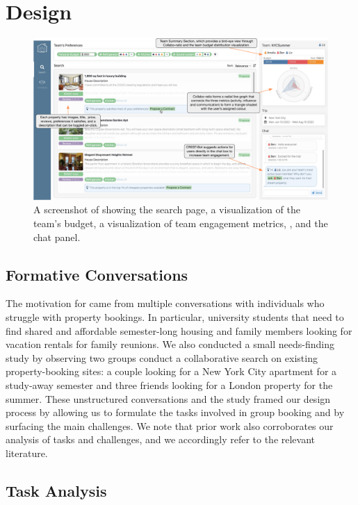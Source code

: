 
\section{Design}
\label{section:design}
\begin{figure}
    \centering
    \includegraphics[width=\textwidth]{images/ui-search.pdf}
    \caption{A screenshot of \tool showing the search page, a visualization of the team's budget, a visualization of team engagement metrics, \collaboRatio, and the chat panel.}
    \label{fig:ui_search}
\end{figure}

\subsection{Formative Conversations} 
\label{ssection:formative-conversations}
The motivation for \tool came from multiple conversations with individuals who struggle with property bookings. In particular, university students that need to find shared and affordable semester-long housing and family members looking for vacation rentals for family reunions. We also conducted a small needs-finding study by observing two groups conduct a collaborative search on existing property-booking sites: a couple looking for a New York City apartment for a study-away semester and three friends looking for a London property for the summer. These unstructured conversations and the study framed our design process by allowing us to formulate the tasks involved in group booking and by surfacing the main challenges. We note that prior work also corroborates our analysis of tasks and challenges, and we accordingly refer to the relevant literature.

\subsection{Task Analysis}
\label{ssection:task}

